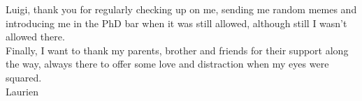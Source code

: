 \documentclass[12pt,a4paper]{article}
\numberwithin{equation}{section}
\numberwithin{figure}{section}
\numberwithin{table}{section}
\begin{document}
\noindent Luigi, thank you for regularly checking up on me, sending me
random memes and introducing me in the PhD bar when it was 
still allowed, although still I wasn't allowed there.\\

\noindent Finally, I want to thank my parents, brother and friends 
for their support along the way, always there to offer some love and distraction
when my eyes were squared. \\

Laurien





\vspace{0.6cm}
\end{document}
